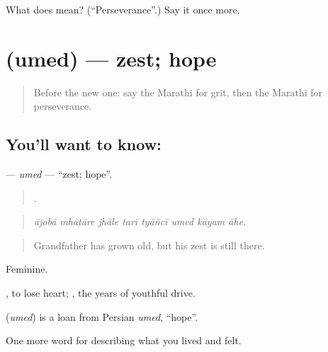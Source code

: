 \begin{tcolorbox}[breakable,colback=teal!4,colframe=teal!35!black,title={Before you move on}]
What does  mean? (\textquotedblleft{}Perseverance\textquotedblright{}.) Say it once more.
\end{tcolorbox}
\section[\texorpdfstring{\mr{उमेद} (umed)}{उमेद (umed)}]{ (umed) — zest; hope}

\label{lesson:MR-C464-umed}



\begin{quote}
Before the new one: say the Marathi for grit, then the Marathi for perseverance.
\end{quote}

\subsection*{You'll want to know: }
\textbf{} — \emph{umed} — \textquotedblleft{}zest; hope\textquotedblright{}.

\begin{quote}
       .
\end{quote}

\begin{quote}
\emph{ājobā mhātāre jhāle tarī tyāñcī umed kāyam āhe.}
\end{quote}

\begin{quote}
Grandfather has grown old, but his zest is still there.
\end{quote}

Feminine.

 , to lose heart;  , the years of youthful drive.

\begin{cousinweb}
\textbf{} (\emph{umed}) is a loan from Persian \emph{umed}, \textquotedblleft{}hope\textquotedblright{}.
\end{cousinweb}

\begin{grammarlens}[title={What you've built}]
One more word for describing what you lived and felt.
\end{grammarlens}

